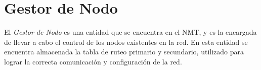 \section{Gestor de Nodo}
El \textit{Gestor de Nodo} es una entidad que se encuentra en el NMT, y es la
encargada de llevar a cabo el control de los nodos existentes en la red. En
esta entidad se encuentra almacenada la tabla de ruteo primario y secundario,
utilizado para lograr la correcta comunicación y configuración de la red.


